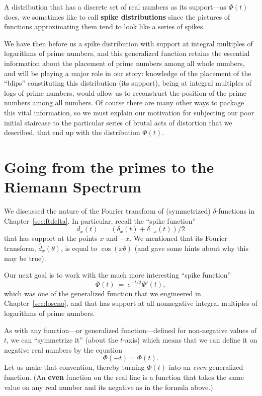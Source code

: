 \documentclass[openany]{book}
\theoremstyle{plain}
\theoremstyle{definition}
\newcommand{\todo}[1]{\par\vspace{1em}{\small---------\\{{\bf To be done:} #1}\\-----------}\par\vspace{1em}}
\begin{document}
A distribution that has a discrete set of real numbers as its
  support---as $\Phi(t)$ does, we sometimes like to call {\bf spike
    distributions} since the pictures of functions approximating them
  tend to look like a series of spikes.

  We have then before us a spike distribution with support at integral
  multiples of logarithms of prime numbers, and this generalized
  function retains the essential information about the placement of
  prime numbers among all whole numbers, and will be playing a major
  role in our story: knowledge of the placement of the ``blips'' constituting this distribution (its
support), being at  integral multiples of logs of prime numbers, would allow us to reconstruct the position of the prime
numbers among all numbers. Of course there are many other ways to package this vital information, so we
must explain our motivation for subjecting our poor initial staircase
to the particular series of brutal acts of distortion that we
described, that end up with the distribution $\Phi(t)$.







\chapter{Going from the primes to the Riemann Spectrum}
\label{ch:prime-to-spectrum}



We  discussed the nature of the Fourier transform of (symmetrized)
$\delta$-functions in Chapter~\ref{sec:ftdelta}. In particular, recall
the ``spike function'' $$d_x(t) \ = \ (\delta_x(t) +
\delta_{-x}(t))/2$$ that has support at the points $x$ and $-x$.  We
mentioned that its Fourier transform, ${\hat d}_x(\theta)$, is equal
to $\cos(x\theta)$ (and gave some hints about why this may be true).


Our next goal is to work with the much more interesting ``spike
function'' $$\Phi(t) \ = \ e^{- t/2}\Psi'(t),$$ which was one of the
generalized function that we engineered in Chapter~\ref{sec:loseno},
and that has support at all nonnegative integral multiples of
logarithms of prime numbers.




As with any function---or generalized function---defined for
non-negative values of $t$, we can ``symmetrize it'' (about the
$t$-axis) which means that we can define it on negative real numbers
by the equation
  $$\Phi(-t) = \Phi(t).$$
  Let us make that convention, thereby turning $\Phi(t)$ into an {\it
    even} generalized function. (An {\bf even} function on the real line is a function that takes the same value on any real number and its negative as in the formula above.)
\end{document}
